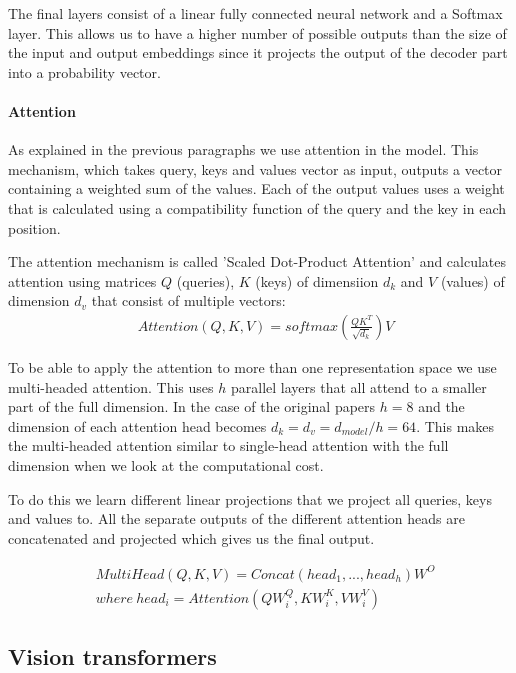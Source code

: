 The final layers consist of a linear fully connected neural network and a Softmax layer. This allows us to have a higher number of possible outputs than the size of the input and output embeddings since it projects the output of the decoder part into a probability vector.

\paragraph{Attention}

As explained in the previous paragraphs we use attention in the model. This mechanism, which takes query, keys and values vector as input, outputs a vector containing a weighted sum of the values. Each of the output values uses a weight that is calculated using a compatibility  function of the query and the key in each position.

The attention mechanism \cite{vaswani_attention_2017} is called 'Scaled Dot-Product Attention' and calculates attention using matrices $Q$ (queries), $K$ (keys) of dimensiion $d_k$ and $V$ (values) of dimension $d_v$ that consist of multiple vectors:
\begin{align}
\label{eq:prelim:softmax-attention}
&Attention(Q, K, V) = softmax(\frac{QK^T} {\sqrt{d_k}})V
\end{align}

To be able to apply the attention to more than one representation space we use multi-headed attention. This uses $h$ parallel layers that all attend to a smaller part of the full dimension. In the case of the original papers $h = 8$ and the dimension of each attention head becomes $d_k = d_v = d_{model} / h = 64$. This makes the multi-headed attention similar to single-head attention with the full dimension when we look at the computational cost.

To do this we learn different linear projections that we project all queries, keys and values to.  All the separate outputs of the different attention heads are concatenated and projected which gives us the final output.

\begin{align}
&MultiHead(Q, K, V) = Concat(head_1, ..., head_h)W^O\\
& where\ head_i = Attention(QW_i^Q, KW_i^K, VW_i^V)
\end{align}


\subsection{Vision transformers}

